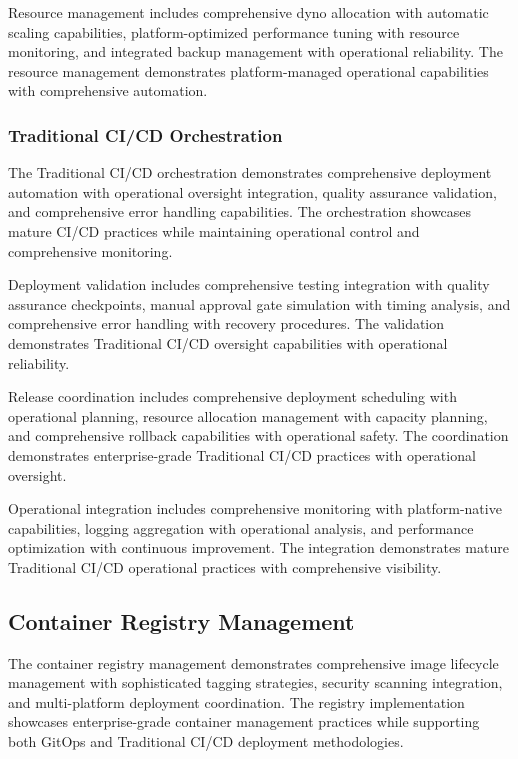 Resource management includes comprehensive dyno allocation with automatic scaling capabilities, platform-optimized performance tuning with resource monitoring, and integrated backup management with operational reliability. The resource management demonstrates platform-managed operational capabilities with comprehensive automation.

\subsubsection{Traditional CI/CD Orchestration}

The Traditional CI/CD orchestration demonstrates comprehensive deployment automation with operational oversight integration, quality assurance validation, and comprehensive error handling capabilities. The orchestration showcases mature CI/CD practices while maintaining operational control and comprehensive monitoring.

Deployment validation includes comprehensive testing integration with quality assurance checkpoints, manual approval gate simulation with timing analysis, and comprehensive error handling with recovery procedures. The validation demonstrates Traditional CI/CD oversight capabilities with operational reliability.

Release coordination includes comprehensive deployment scheduling with operational planning, resource allocation management with capacity planning, and comprehensive rollback capabilities with operational safety. The coordination demonstrates enterprise-grade Traditional CI/CD practices with operational oversight.

Operational integration includes comprehensive monitoring with platform-native capabilities, logging aggregation with operational analysis, and performance optimization with continuous improvement. The integration demonstrates mature Traditional CI/CD operational practices with comprehensive visibility.

\subsection{Container Registry Management}

The container registry management demonstrates comprehensive image lifecycle management with sophisticated tagging strategies, security scanning integration, and multi-platform deployment coordination. The registry implementation showcases enterprise-grade container management practices while supporting both GitOps and Traditional CI/CD deployment methodologies.

